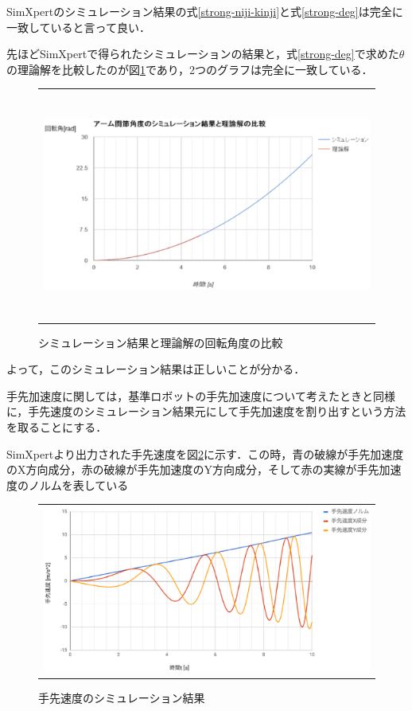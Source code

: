 SimXpertのシミュレーション結果の式\ref{strong-niji-kinji}と式\ref{strong-deg}は完全に一致していると言って良い．

先ほどSimXpertで得られたシミュレーションの結果と，式\ref{strong-deg}で求めた\(\theta\)の理論解を比較したのが図\ref{strong-compare}であり，2つのグラフは完全に一致している．

\begin{figure}[htbp]
  \begin{center}
    \begin{tabular}{c}
      \includegraphics[height=7.5cm]{img/eps/strong-compare.eps}
    \end{tabular}
    \caption{シミュレーション結果と理論解の回転角度の比較}
    \label{strong-compare}
  \end{center}
\end{figure}

よって，このシミュレーション結果は正しいことが分かる．

手先加速度に関しては，基準ロボットの手先加速度について考えたときと同様に，手先速度のシミュレーション結果元にして手先加速度を割り出すという方法を取ることにする．

SimXpertより出力された手先速度を図\ref{strong-tesaki-sokudo}に示す．この時，青の破線が手先加速度のX方向成分，赤の破線が手先加速度のY方向成分，そして赤の実線が手先加速度のノルムを表している

\begin{figure}[htbp]
  \begin{center}
    \begin{tabular}{c}
      \includegraphics[height=5.5cm]{img/eps/strong-tesaki-sokudo2.eps}
    \end{tabular}
    \caption{手先速度のシミュレーション結果}
    \label{strong-tesaki-sokudo}
  \end{center}
\end{figure}

